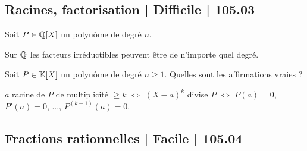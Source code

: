 \subsection{Racines, factorisation | Difficile | 105.03}


\begin{question}

Soit $P \in \mathbb{Q}[X]$ un polynôme de degré $n$.
\begin{answers}



\end{answers}
\begin{explanations}
Sur $\mathbb{Q}$ les facteurs irréductibles peuvent être de n'importe quel degré.
\end{explanations}
\end{question}



\begin{question}

Soit $P \in \mathbb{K}[X]$ un polynôme de degré $n\ge1$.
Quelles sont les affirmations vraies ?
\begin{answers}

    

   
\end{answers}
\begin{explanations}
$a$ racine de $P$ de multiplicité $\ge k$ $\iff$ $(X-a)^k$ divise $P$ $\iff$ $P(a) = 0$, $P'(a)=0$, ..., $P^{(k-1)}(a)=0$.
\end{explanations}
\end{question}

\subsection{Fractions rationnelles | Facile | 105.04}

